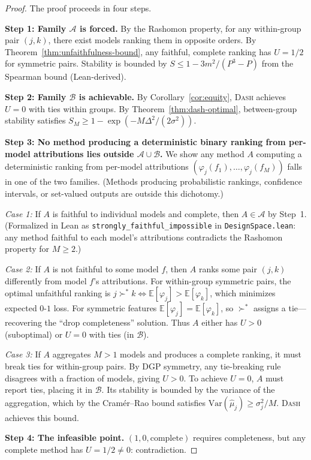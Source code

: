 \documentclass{article}
\newcommand{\E}{\mathbb{E}}
\newcommand{\Var}{\mathrm{Var}}
\newcommand{\DASH}{\textsc{Dash}}
\begin{document}
\begin{proof}
The proof proceeds in four steps.

\textbf{Step 1: Family $\mathcal{A}$ is forced.}
By the Rashomon property, for any within-group pair $(j,k)$, there exist models ranking them in opposite orders. By Theorem~\ref{thm:unfaithfulness-bound}, any faithful, complete ranking has $U = 1/2$ for symmetric pairs. Stability is bounded by $S \leq 1 - 3m^2/(P^3{-}P)$ from the Spearman bound (Lean-derived).

\textbf{Step 2: Family $\mathcal{B}$ is achievable.}
By Corollary~\ref{cor:equity}, \DASH{} achieves $U = 0$ with ties within groups. By Theorem~\ref{thm:dash-optimal}, between-group stability satisfies $S_M \geq 1 - \exp(-M\Delta^2/(2\sigma^2))$.

\textbf{Step 3: No method producing a deterministic binary ranking from per-model attributions lies outside $\mathcal{A} \cup \mathcal{B}$.}
We show any method $A$ computing a deterministic ranking from per-model attributions $(\varphi_j(f_1), \ldots, \varphi_j(f_M))$ falls in one of the two families. (Methods producing probabilistic rankings, confidence intervals, or set-valued outputs are outside this dichotomy.)

\emph{Case 1:} If $A$ is faithful to individual models and complete, then $A \in \mathcal{A}$ by Step~1. (Formalized in Lean as \texttt{strongly\_faithful\_impossible} in \texttt{DesignSpace.lean}: any method faithful to each model's attributions contradicts the Rashomon property for $M \geq 2$.)

\emph{Case 2:} If $A$ is not faithful to some model $f$, then $A$ ranks some pair $(j,k)$ differently from model $f$'s attributions. For within-group symmetric pairs, the optimal unfaithful ranking is $j \succ^* k \Leftrightarrow \E[\varphi_j] > \E[\varphi_k]$, which minimizes expected $0$-$1$ loss. For symmetric features $\E[\varphi_j] = \E[\varphi_k]$, so $\succ^*$ assigns a tie---recovering the ``drop completeness'' solution. Thus $A$ either has $U > 0$ (suboptimal) or $U = 0$ with ties (in $\mathcal{B}$).

\emph{Case 3:} If $A$ aggregates $M > 1$ models and produces a complete ranking, it must break ties for within-group pairs. By DGP symmetry, any tie-breaking rule disagrees with a fraction of models, giving $U > 0$. To achieve $U = 0$, $A$ must report ties, placing it in $\mathcal{B}$. Its stability is bounded by the variance of the aggregation, which by the Cram\'er--Rao bound satisfies $\Var(\hat\mu_j) \geq \sigma_j^2/M$. \DASH{} achieves this bound.

\textbf{Step 4: The infeasible point.}
$(1, 0, \text{complete})$ requires completeness, but any complete method has $U = 1/2 \neq 0$: contradiction.
\end{proof}
\end{document}
